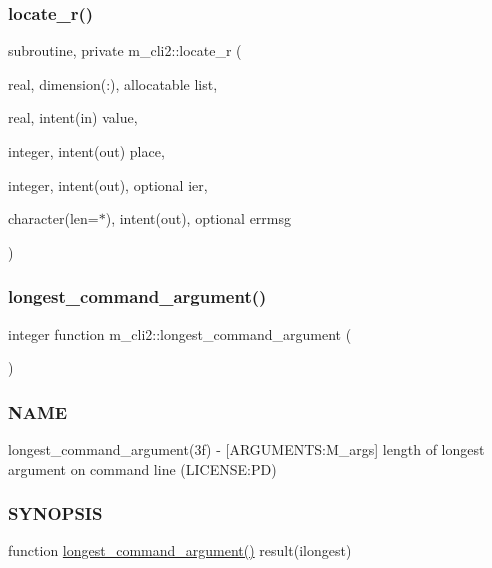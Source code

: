 \subsubsection{\texorpdfstring{locate\+\_\+r()}{locate\_r()}}
{\footnotesize\ttfamily subroutine, private m\+\_\+cli2\+::locate\+\_\+r (\begin{DoxyParamCaption}\item[{real, dimension(\+:), allocatable}]{list,  }\item[{real, intent(in)}]{value,  }\item[{integer, intent(out)}]{place,  }\item[{integer, intent(out), optional}]{ier,  }\item[{character(len=$\ast$), intent(out), optional}]{errmsg }\end{DoxyParamCaption})\hspace{0.3cm}{\ttfamily [private]}}

\mbox{\label{namespacem__cli2_a7240f12031027172b87fde623bd77958}} 
\subsubsection{\texorpdfstring{longest\+\_\+command\+\_\+argument()}{longest\_command\_argument()}}
{\footnotesize\ttfamily integer function m\+\_\+cli2\+::longest\+\_\+command\+\_\+argument (\begin{DoxyParamCaption}{ }\end{DoxyParamCaption})\hspace{0.3cm}{\ttfamily [private]}}



\subsubsection*{N\+A\+ME}

longest\+\_\+command\+\_\+argument(3f) -\/ \mbox{[}A\+R\+G\+U\+M\+E\+N\+TS\+:M\+\_\+args\mbox{]} length of longest argument on command line (L\+I\+C\+E\+N\+SE\+:PD) \subsubsection*{S\+Y\+N\+O\+P\+S\+IS}

function \mbox{\hyperlink{namespacem__cli2_a7240f12031027172b87fde623bd77958}{longest\+\_\+command\+\_\+argument()}} result(ilongest)

